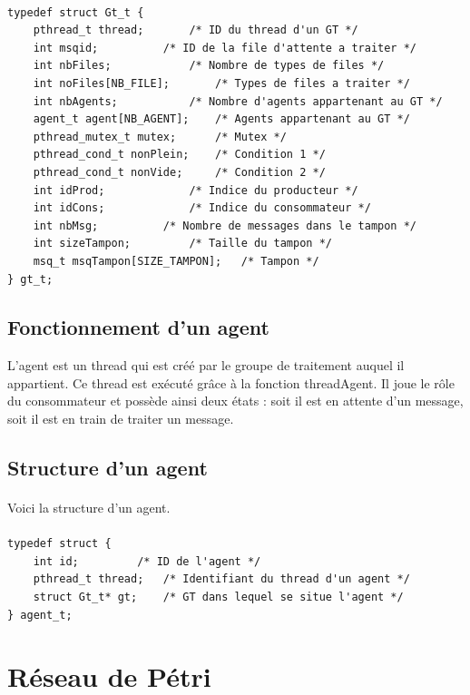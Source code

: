 \documentclass{report}
\begin{document}
			\paragraph{}
				\lstset{language=C}
				\begin{lstlisting}
typedef struct Gt_t {
	pthread_t thread; 		/* ID du thread d'un GT */
	int msqid;			/* ID de la file d'attente a traiter */
	int nbFiles;	 		/* Nombre de types de files */
	int noFiles[NB_FILE]; 		/* Types de files a traiter */
	int nbAgents; 			/* Nombre d'agents appartenant au GT */
	agent_t agent[NB_AGENT]; 	/* Agents appartenant au GT */
	pthread_mutex_t mutex; 		/* Mutex */
	pthread_cond_t nonPlein; 	/* Condition 1 */
	pthread_cond_t nonVide; 	/* Condition 2 */
	int idProd; 			/* Indice du producteur */
	int idCons; 			/* Indice du consommateur */
	int nbMsg;			/* Nombre de messages dans le tampon */
	int sizeTampon; 		/* Taille du tampon */
	msq_t msqTampon[SIZE_TAMPON]; 	/* Tampon */
} gt_t;
				\end{lstlisting}
		\subsection{Fonctionnement d'un agent}
			L'agent est un thread qui est créé par le groupe de traitement auquel il appartient. Ce thread est exécuté grâce à la fonction threadAgent. Il joue le rôle du consommateur et possède ainsi deux états : soit il est en attente d'un message, soit il est en train de traiter un message.
		\subsection{Structure d'un agent}
			\paragraph{}
				Voici la structure d'un agent.
			\paragraph{}
				\lstset{language=C}
				\begin{lstlisting}
typedef struct {
	int id;			/* ID de l'agent */
	pthread_t thread;	/* Identifiant du thread d'un agent */
	struct Gt_t* gt;	/* GT dans lequel se situe l'agent */
} agent_t;
				\end{lstlisting}
	\newpage
	\section{Réseau de Pétri}
\end{document}
